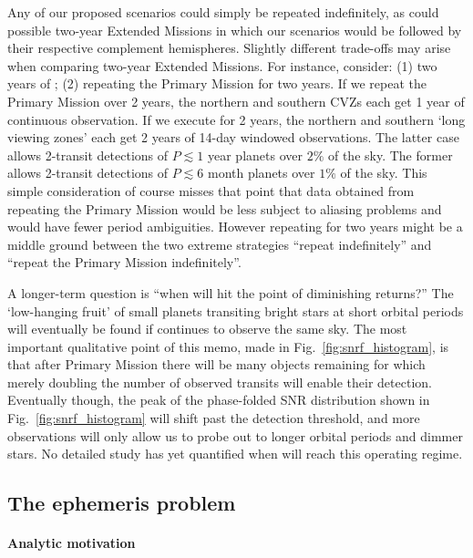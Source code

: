 Any of our proposed scenarios could simply be repeated indefinitely,
as could possible two-year Extended Missions in which our scenarios 
would be followed by their respective complement hemispheres.
Slightly different trade-offs may arise when comparing two-year
Extended Missions.
For instance, consider: (1) two years of \hemis; (2) repeating the 
Primary Mission for two years.
If we repeat the Primary Mission over 2 years, the northern
and southern CVZs each get 1 year of continuous observation.  If we
execute \hemis\:for 2 years, the northern and southern `long viewing
zones' each get 2 years of 14-day windowed observations.  The latter
case allows 2-transit detections of $P\lesssim1$ year planets over
$2\%$ of the sky.  The former allows 2-transit detections of
$P\lesssim6$ month planets over $1\%$ of the sky.  This simple
consideration of course misses that point that data obtained from
repeating the Primary Mission would be less subject to aliasing
problems and would have fewer period ambiguities.  However
repeating \hemis\:for two years might be a middle ground between the
two extreme strategies ``repeat \npole\:indefinitely'' and ``repeat
the Primary Mission indefinitely''.

A longer-term question is ``when will \tess hit the point of
diminishing returns?''  The `low-hanging fruit' of small planets
transiting bright stars at short orbital periods will eventually be
found if \tess continues to observe the same sky.  The most important
qualitative point of this memo, made in Fig.~\ref{fig:snrf_histogram},
is that after \tesss Primary Mission there will be many objects
remaining for which merely doubling the number of observed transits
will enable their detection.  Eventually though, the peak of the
phase-folded SNR distribution shown in Fig.~\ref{fig:snrf_histogram}
will shift past the detection threshold, and more observations will
only allow us to probe out to longer orbital periods and dimmer stars.
No detailed study has yet quantified when \tess will reach this
operating regime.

\subsection{The ephemeris problem}
\label{sec:ephemeris_times}

\paragraph{Analytic motivation}

